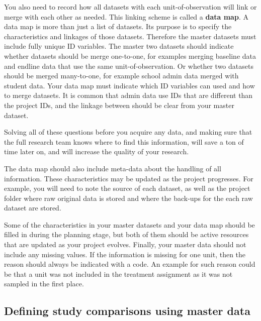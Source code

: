 You also need to record how all datasets with each unit-of-observation
will link or merge with each other as needed.
This linking scheme is called a \textbf{data map}.
A data map is more than just a list of datasets.
Its purpose is to specify the characteristics and linkages of those datasets.
Therefore the master datasets must include fully unique ID variables.
The master two datasets should indicate whether datasets should be merge one-to-one,
for examples merging baseline data and endline data that use the same unit-of-observation.
Or whether two datasets should be merged many-to-one, 
for example school admin data merged with student data.
Your data map must indicate which ID variables can used and how to merge datasets.
It is common that admin data use IDs 
that are different than the project IDs, 
and the linkage between should be clear from your master dataset.

Solving all of these questions before you acquire any data,
and making sure that the full research team knows where to find this information,
will save a ton of time later on,
and will increase the quality of your research.

The data map should also include meta-data about the handling of all information.
These characteristics may be updated as the project progresses.
For example, you will need to note the source of each dataset,
as well as the project folder where raw original data is stored
and where the back-ups for the each raw dataset are stored.

Some of the characteristics in your master datasets and your data map
should be filled in during the planning stage,
but both of them should be active resources 
that are updated as your project evolves.
Finally, your master data should not include any missing values. 
If the information is missing for one unit, 
then the reason should always be indicated with a code.
An example for such reason could be that a unit was not included in the treatment assignment
as it was not sampled in the first place.

\subsection{Defining study comparisons using master data}

